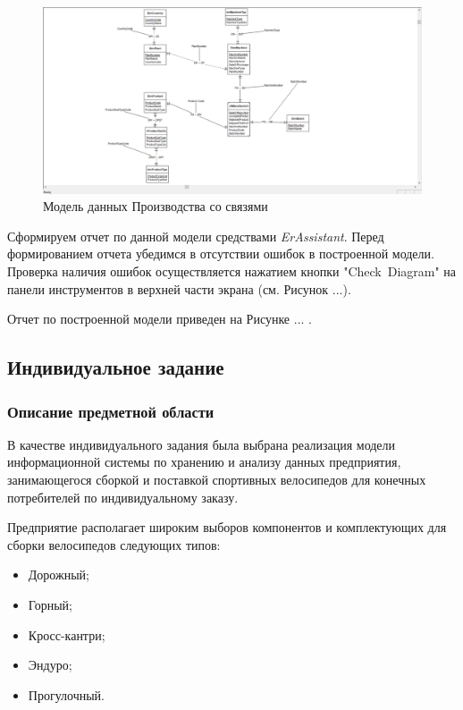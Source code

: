 \documentclass[a4paper,14pt]{extarticle}
\newcommand{\erassistant}{\textit{ErAssistant}}
\begin{document}
\newpage 

\begin{figure}[hpbt]
	\centering
	\includegraphics[width=\linewidth]{images/1-metod}
	\caption{Модель данных Производства со связями}
	\label{fig:1-metod}
\end{figure}
Сформируем отчет по данной модели средствами \erassistant. Перед формированием отчета убедимся в отсутствии ошибок в построенной модели. Проверка наличия ошибок осуществляется нажатием кнопки "Check~Diagram" на панели инструментов в верхней части экрана (см. Рисунок ...).

Отчет по построенной модели приведен на Рисунке ... .

\subsection{Индивидуальное задание}
\subsubsection*{Описание предметной области}
В качестве индивидуального задания была выбрана реализация модели информационной системы по хранению и анализу данных  предприятия, занимающегося сборкой и поставкой спортивных велосипедов для конечных потребителей по индивидуальному заказу.

Предприятие располагает широким выборов компонентов и комплектующих для сборки велосипедов следующих типов:
\begin{itemize}
	\item Дорожный;
	\item Горный;
	\item Кросс-кантри;
	\item Эндуро;
	\item Прогулочный.
\end{itemize}
\end{document}
